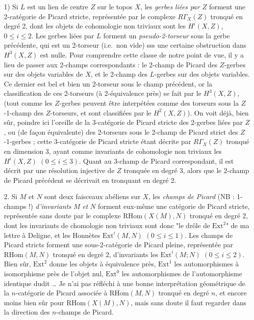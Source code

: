 \documentclass[11pt,a4paper]{article}
\begin{document}
1) Si $L$ est un lien  de centre $Z$ sur le topos $X$, les
\emph{gerbes liées par $Z$} forment une 2-catégorie de Picard stricte,
représentée par le complexe $R\Gamma_X(Z)$ tronqué en degré 2, dont les objets
de cohomologie non triviaux sont les $H^i(X,Z)$, $0\leqslant i\leqslant 2$. Les
gerbes liées par $L$ forment un \emph{pseudo-2-torseur} sous la gerbe
précédente, qui est un 2-torseur (i.e.\ non vide) sss une certaine obstruction
dans $H^3(X,Z)$ est nulle. Pour comprendre cette classe de notre point de vue,
il y a lieu de passer aux 2-champs correspondants : le 2-champ de Picard
 des $Z$-gerbes  sur des
objets variables de $X$, et le 2-champ des $L$-gerbes sur des objets variables.
Ce dernier est bel et bien un 2-torseur sous le champ précédent, or la
classification de ces  2-torseurs (à 2-équivalence près) se fait
par le $H^3(X,Z)$,  (tout comme les $Z$-gerbes
peuvent être interpétées comme des torseurs sous la
$Z$-1-champ  des $Z$-torseurs, et sont  classifiées par le $H^2(X,Z)$). On voit déjà, bien sûr, poindre
ici l'oreille de la 3-catégorie de Picard stricte des 2-gerbes liées par $Z$,
ou (de façon équivalente) des 2-torseurs sous le 2-champ de Picard strict des
$Z$-1-gerbes ; cette 3-catégorie de Picard stricte étant décrite par
$R\Gamma_X(Z)$ tronqué en dimension 3, ayant comme invariants de cohomologie
non triviaux les $H^i(X,Z)$ $(0\leqslant i\leqslant 3)$. Quant au 3-champ de
Picard correspondant, il est décrit par une résolution injective de $Z$
tronquée en degré 3, alors que le 2-champ de Picard précédent se décrivait en
tronquant en degré 2.

2. Si $M$ et $N$ sont deux faisceaux abéliens sur $X$, les \emph{champs de
Picard} (NB : 1-champs !) \emph{d'invariants} $M$ \emph{et} $N$ forment
eux-même une catégorie de Picard stricte, représentée sans doute par le
complexe $\mathrm{RHom}(X(M),N)$  tronqué en  degré
2, dont les invariants de chomologie non triviaux sont donc "le drôle
de $\mathrm{Ext}^2$" de ma lettre à Deligne, et les Honnètes
$\mathrm{Ext}^i(M,N)$ $(0\leqslant i\leqslant 1)$.
Les champs de Picard stricts forment une sous-2-catégorie de Picard pleine,
représentée par $\mathrm{RHom}(M,N)$ tronqué en degré 2, d'invariants les
$\mathrm{Ext}^i(M;N)$ $(0\leqslant i\leqslant 2)$. Bien sûr, $\mathrm{Ext}^2$
donne les objets à équivalence près, $\mathrm{Ext}^1$ les
automorphismes à isomorphisme près de l'objet nul, $\mathrm{Ext}^0$ les
automorphismes de l'automorphisme identique dudit … Je n'ai pas réfléchi à une
bonne interprétation géométrique de la $n$-catégorie de Picard associée à
$\mathrm{RHom}(M,N)$ tronqué en degré $n$, et encore moins bien sûr pour
$\mathrm{RHom}(X(M),N)$, mais sans doute il faut regarder dans la direction des
$n$-champs de Picard.
\end{document}
